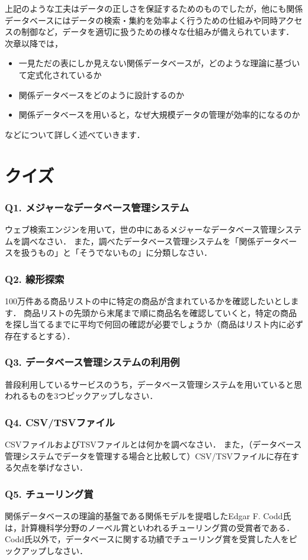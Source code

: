 上記のような工夫はデータの正しさを保証するためのものでしたが，他にも関係データベースにはデータの検索・集約を効率よく行うための仕組みや同時アクセスの制御など，データを適切に扱うための様々な仕組みが備えられています．
次章以降では，
\begin{itemize}
\item 一見ただの表にしか見えない関係データベースが，どのような理論に基づいて定式化されているか
\item 関係データベースをどのように設計するのか
\item 関係データベースを用いると，なぜ大規模データの管理が効率的になるのか
\end{itemize}
などについて詳しく述べていきます．


\hrulefill
\section{クイズ}
\subsubsection{Q1. メジャーなデータベース管理システム}
ウェブ検索エンジンを用いて，世の中にあるメジャーなデータベース管理システムを調べなさい．
また，調べたデータベース管理システムを「関係データベースを扱うもの」と「そうでないもの」に分類しなさい．

\subsubsection{Q2. 線形探索}
100万件ある商品リストの中に特定の商品が含まれているかを確認したいとします．
商品リストの先頭から末尾まで順に商品名を確認していくと，特定の商品を探し当てるまでに平均で何回の確認が必要でしょうか（商品はリスト内に必ず存在するとする）．

\subsubsection{Q3. データベース管理システムの利用例}
普段利用しているサービスのうち，データベース管理システムを用いていると思われるものを3つピックアップしなさい．

\subsubsection{Q4. CSV/TSVファイル}
CSVファイルおよびTSVファイルとは何かを調べなさい．
また，（データベース管理システムでデータを管理する場合と比較して）CSV/TSVファイルに存在する欠点を挙げなさい．

\subsubsection{Q5. チューリング賞}
関係データベースの理論的基盤である関係モデルを提唱したEdgar F. Codd氏は，計算機科学分野のノーベル賞といわれるチューリング賞の受賞者である．
Codd氏以外で，データベースに関する功績でチューリング賞を受賞した人をピックアップしなさい．
